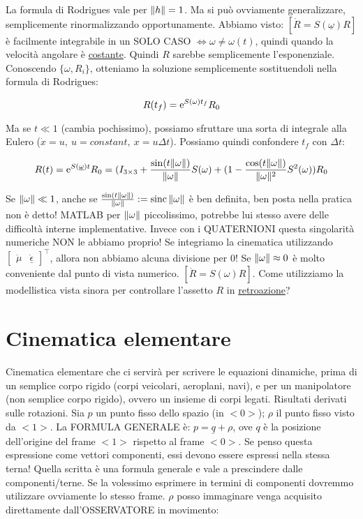 La formula di Rodrigues vale per $\lVert h\rVert=1$. Ma si può ovviamente generalizzare, semplicemente rinormalizzando opportunamente. Abbiamo visto: $[\dot{R}=S(\underline{\omega})R]$ è facilmente integrabile in un SOLO CASO $\iff \omega\neq \omega(t)$, quindi quando la velocità angolare è \underline{costante}. Quindi $R$ sarebbe semplicemente l'esponenziale. Conoscendo $\{\omega,R_i\}$, otteniamo la soluzione semplicemente sostituendoli nella formula di Rodrigues:

\[
	R(t_f) = \mathop{}\!\mathrm{e}^{S(\omega)t_f}R_0
\]

Ma se $t\ll 1$ (cambia pochissimo), possiamo sfruttare una sorta di integrale alla Eulero ($\dot{x}=u,\ u=constant,\ x=u\Delta t$). Possiamo quindi confondere $t_f$ con $\Delta t$:

\[
	R(t) = \mathop{}\!\mathrm{e}^{S(\underline{\omega})t}R_0 = (I_{3\times 3} + \frac{\sin(t\lVert\omega\rVert)}{\lVert\omega\rVert}S(\omega) + (1-\frac{\cos(t\lVert\omega\rVert)}{\lVert\omega\rVert^2}S^2(\omega))R_0
\]

Se $\lVert\omega\rVert\ll 1$, anche se $\frac{\sin(t\lVert\omega\rVert)}{\lVert\omega\rVert} := \operatorname{sinc}{\lVert\omega\rVert}$ è ben definita, ben posta nella pratica non è detto! MATLAB per $\lVert\omega\rVert$ piccolissimo, potrebbe lui stesso avere delle difficoltà interne implementative. Invece con i QUATERNIONI questa singolarità numeriche NON le abbiamo proprio! Se integriamo la cinematica utilizzando $\begin{bmatrix}\dot{\mu}&\underline{\dot{\epsilon}}\end{bmatrix}^\top$, allora non abbiamo alcuna divisione per 0! Se $\lVert\omega\rVert\approx 0$ è molto conveniente dal punto di vista numerico. $[\dot{R}=S(\omega)R]$. Come utilizziamo la modellistica vista sinora per controllare l'assetto $R$ in \underline{retroazione}?

\section{Cinematica elementare}

Cinematica elementare che ci servirà per scrivere le equazioni dinamiche, prima di un semplice corpo rigido (corpi veicolari, aeroplani, navi), e per un manipolatore (non semplice corpo rigido), ovvero un insieme di corpi legati. Risultati derivati sulle rotazioni. Sia $p$ un punto fisso dello spazio (in $<0>$); $\rho$ il punto fisso visto da $<1>$. La FORMULA GENERALE è: $\underline{p = q+\rho}$, ove $q$ è la posizione dell'origine del frame $<1>$ rispetto al frame $<0>$. Se penso questa espressione come vettori componenti, essi devono essere espressi nella stessa terna! Quella scritta è una formula generale e vale a prescindere dalle componenti/terne. Se la volessimo esprimere in termini di componenti dovremmo utilizzare ovviamente lo stesso frame. $\rho$ posso immaginare venga acquisito direttamente dall'OSSERVATORE in movimento:

